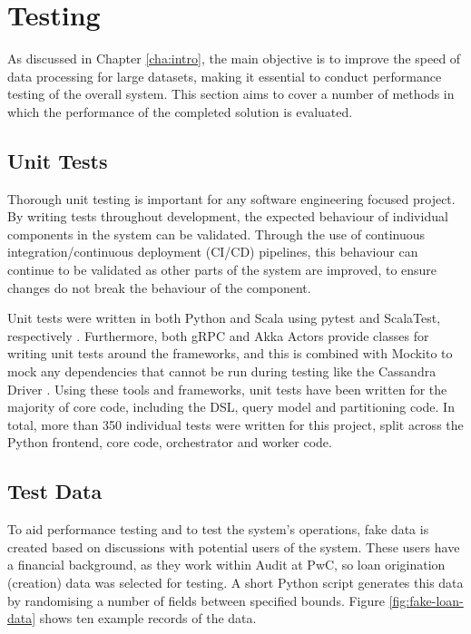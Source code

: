 \chapter{Testing}\label{cha:testing}


As discussed in Chapter \ref{cha:intro}, the main objective is to improve the speed of data processing for large datasets, making it essential to conduct performance testing of the overall system. This section aims to cover a number of methods in which the performance of the completed solution is evaluated.




\section{Unit Tests}
Thorough unit testing is important for any software engineering focused project. By writing tests throughout development, the expected behaviour of individual components in the system can be validated. Through the use of continuous integration/continuous deployment (CI/CD) pipelines, this behaviour can continue to be validated as other parts of the system are improved, to ensure changes do not break the behaviour of the component. 

Unit tests were written in both Python and Scala using pytest and ScalaTest, respectively \cite{pytest, scalatestuserguide}. Furthermore, both gRPC and Akka Actors provide classes for writing unit tests around the frameworks, and this is combined with Mockito to mock any dependencies that cannot be run during testing like the Cassandra Driver \cite{scalatestplusmockito, datastaxjavadriver}. Using these tools and frameworks, unit tests have been written for the majority of core code, including the DSL, query model and partitioning code. In total, more than 350 individual tests were written for this project, split across the Python frontend, core code, orchestrator and worker code.



\section{Test Data}
To aid performance testing and to test the system's operations, fake data is created based on discussions with potential users of the system. These users have a financial background, as they work within Audit at PwC, so loan origination (creation) data was selected for testing. A short Python script generates this data by randomising a number of fields between specified bounds. Figure \ref{fig:fake-loan-data} shows ten example records of the data.

